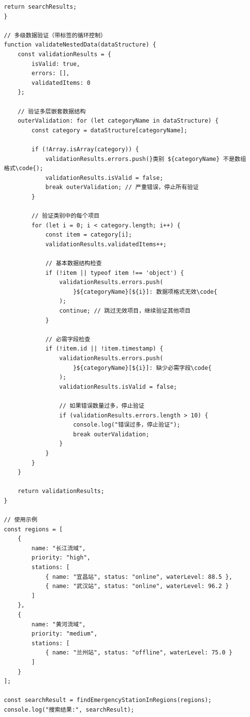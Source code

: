 {\begin{lstlisting}[style=javascript]
    return searchResults;
}

// 多级数据验证（带标签的循环控制）
function validateNestedData(dataStructure) {
    const validationResults = {
        isValid: true,
        errors: [],
        validatedItems: 0
    };
    
    // 验证多层嵌套数据结构
    outerValidation: for (let categoryName in dataStructure) {
        const category = dataStructure[categoryName];
        
        if (!Array.isArray(category)) {
            validationResults.errors.push(}类别 ${categoryName} 不是数组格式\code{);
            validationResults.isValid = false;
            break outerValidation; // 严重错误，停止所有验证
        }
        
        // 验证类别中的每个项目
        for (let i = 0; i < category.length; i++) {
            const item = category[i];
            validationResults.validatedItems++;
            
            // 基本数据结构检查
            if (!item || typeof item !== 'object') {
                validationResults.errors.push(
                    }${categoryName}[${i}]: 数据项格式无效\code{
                );
                continue; // 跳过无效项目，继续验证其他项目
            }
            
            // 必需字段检查
            if (!item.id || !item.timestamp) {
                validationResults.errors.push(
                    }${categoryName}[${i}]: 缺少必需字段\code{
                );
                validationResults.isValid = false;
                
                // 如果错误数量过多，停止验证
                if (validationResults.errors.length > 10) {
                    console.log("错误过多，停止验证");
                    break outerValidation;
                }
            }
        }
    }
    
    return validationResults;
}

// 使用示例
const regions = [
    {
        name: "长江流域", 
        priority: "high",
        stations: [
            { name: "宜昌站", status: "online", waterLevel: 88.5 },
            { name: "武汉站", status: "online", waterLevel: 96.2 }
        ]
    },
    {
        name: "黄河流域", 
        priority: "medium",
        stations: [
            { name: "兰州站", status: "offline", waterLevel: 75.0 }
        ]
    }
];

const searchResult = findEmergencyStationInRegions(regions);
console.log("搜索结果:", searchResult);
\end{lstlisting}

}
